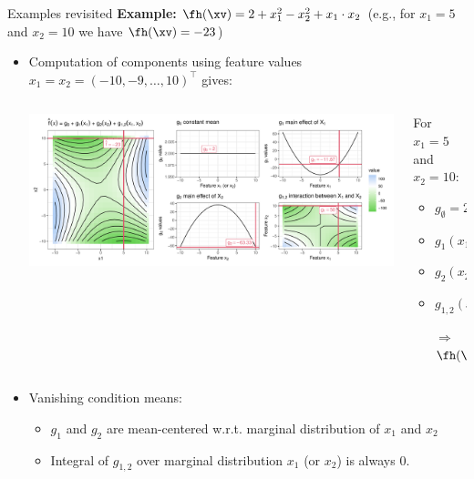 \documentclass[11pt,compress,t,notes=noshow, aspectratio=169, xcolor=table]{beamer}
\newcommand{\open}{}
\newcommand{\close}{}
\begin{document}
\begin{frame}{Examples revisited}
\textbf{Example:} $\fh(\xv) = 2 + x_1^2 - x_2^2 + x_1 \cdot x_2$ (e.g., for $x_1 = 5$ and $x_2 = 10$ we have $\fh(\xv) = -23$)

\begin{itemize}
    \item Computation of components using feature values $x_1 = x_2 = (-10, -9, \ldots, 10)^\top$ gives:
    \begin{columns}[c, totalwidth=\linewidth]
    \begin{column}{0.75\textwidth}
        \includegraphics[width = \textwidth]{figure/decomposition}
    \end{column}
    \begin{column}{0.25\textwidth}
    For $x_1 = 5$ and $x_2 = 10$:\\
    \begin{itemize}
        \item $g_{\open \emptyset \close} = 2$
        \item $g_{\open 1 \close}(x_1) = -9.67$
        \item $g_{\open 2 \close}(x_2) = -65.33$
        \item $g_{\open 1,2 \close}(x_1, x_2) = 50$
        \item[$\Rightarrow$] $\fh(\xv) = -23$
    \end{itemize}
    \end{column}
    \end{columns}
    \item Vanishing condition means:
    \begin{itemize}
        \item $g_1$ and $g_2$ are mean-centered w.r.t. marginal distribution of $x_1$ and $x_2$
        \item Integral of $g_{1,2}$ over marginal distribution $x_1$ (or $x_2$) is always 0.
    \end{itemize}
\end{itemize} 
\end{frame}
\end{document}
